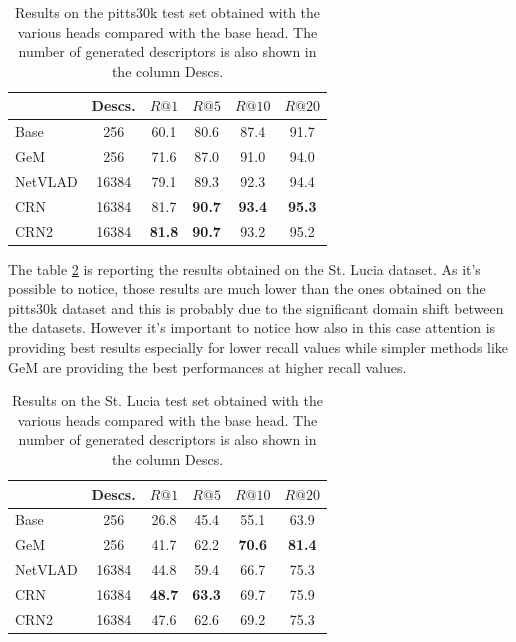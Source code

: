 \documentclass[10pt,twocolumn,letterpaper]{article}
\begin{document}
\begin{table}
	\centering
	\begin{tabular}{|l|c|c|c|c|c|}
		\hline
		& Descs.&        $R@1$   &        $R@5$   &        $R@10$  &        $R@20$   \\ \hline
		Base     & 256   &         60.1   &         80.6   &          87.4   &          91.7   \\
		GeM      & 256   &         71.6   &         87.0   &          91.0   &          94.0   \\
		NetVLAD  & 16384 &         79.1   &         89.3   &          92.3   &          94.4   \\ \hline
		CRN      & 16384 &         81.7   & \textbf{90.7}  &  \textbf{93.4}  &  \textbf{95.3}  \\
		CRN2     & 16384 &\textbf{81.8}   & \textbf{90.7}  &          93.2   &          95.2   \\ \hline
	\end{tabular}
	\caption{Results on the pitts30k test set obtained with the various heads compared with the base head. The number of generated descriptors 
		is also shown in the column Descs.}
	\label{tab:base_results}
\end{table}

The table \ref{tab:base_results:st_lucia} is reporting the results obtained on the St. Lucia dataset. As it's possible to notice, 
those results are much lower than the ones obtained on the pitts30k dataset and this is probably due to the significant domain shift between the datasets.
However it's important to notice how also in this case attention is providing best results especially for lower recall values while
simpler methods like GeM are providing the best performances at higher recall values. 
\begin{table}
	\centering
	\begin{tabular}{|l|c|c|c|c|c|}
		\hline
		& Descs.&        $R@1$   &        $R@5$   &        $R@10$  &        $R@20$   \\ \hline
		Base     & 256   &         26.8   &         45.4   &          55.1   &          63.9   \\
		GeM      & 256   &         41.7   &         62.2   &  \textbf{70.6}  &  \textbf{81.4}   \\
		NetVLAD  & 16384 &         44.8   &         59.4   &          66.7   &          75.3   \\ \hline
		CRN      & 16384 & \textbf{48.7}  & \textbf{63.3}  &          69.7   &          75.9  \\
		CRN2     & 16384 &         47.6   &         62.6   &          69.2   &          75.3   \\ \hline
	\end{tabular}
	\caption{Results on the St. Lucia test set obtained with the various heads compared with the base head. The number of generated descriptors 
		is also shown in the column Descs.}
	\label{tab:base_results:st_lucia}
\end{table}
\end{document}

